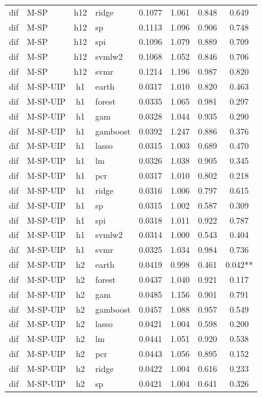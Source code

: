 \begin{ThreePartTable}
\begin{longtable}[t]{llclcccc}
dif & M-SP & h12 & ridge & 0.1077 & 1.061 & 0.848 & 0.649\\
dif & M-SP & h12 & sp & 0.1113 & 1.096 & 0.906 & 0.748\\
dif & M-SP & h12 & spi & 0.1096 & 1.079 & 0.889 & 0.709\\
dif & M-SP & h12 & svmlw2 & 0.1068 & 1.052 & 0.846 & 0.706\\
dif & M-SP & h12 & svmr & 0.1214 & 1.196 & 0.987 & 0.820\\
\addlinespace
dif & M-SP-UIP & h1 & earth & 0.0317 & 1.010 & 0.820 & 0.463\\
dif & M-SP-UIP & h1 & forest & 0.0335 & 1.065 & 0.981 & 0.297\\
dif & M-SP-UIP & h1 & gam & 0.0328 & 1.044 & 0.935 & 0.290\\
dif & M-SP-UIP & h1 & gamboost & 0.0392 & 1.247 & 0.886 & 0.376\\
dif & M-SP-UIP & h1 & lasso & 0.0315 & 1.003 & 0.689 & 0.470\\
dif & M-SP-UIP & h1 & lm & 0.0326 & 1.038 & 0.905 & 0.345\\
dif & M-SP-UIP & h1 & pcr & 0.0317 & 1.010 & 0.802 & 0.218\\
dif & M-SP-UIP & h1 & ridge & 0.0316 & 1.006 & 0.797 & 0.615\\
dif & M-SP-UIP & h1 & sp & 0.0315 & 1.002 & 0.587 & 0.309\\
dif & M-SP-UIP & h1 & spi & 0.0318 & 1.011 & 0.922 & 0.787\\
dif & M-SP-UIP & h1 & svmlw2 & 0.0314 & 1.000 & 0.543 & 0.404\\
dif & M-SP-UIP & h1 & svmr & 0.0325 & 1.034 & 0.984 & 0.736\\
\addlinespace
dif & M-SP-UIP & h2 & earth & 0.0419 & 0.998 & 0.461 & 0.042**\\
dif & M-SP-UIP & h2 & forest & 0.0437 & 1.040 & 0.921 & 0.117\\
dif & M-SP-UIP & h2 & gam & 0.0485 & 1.156 & 0.901 & 0.791\\
dif & M-SP-UIP & h2 & gamboost & 0.0457 & 1.088 & 0.957 & 0.549\\
dif & M-SP-UIP & h2 & lasso & 0.0421 & 1.004 & 0.598 & 0.200\\
dif & M-SP-UIP & h2 & lm & 0.0441 & 1.051 & 0.920 & 0.538\\
dif & M-SP-UIP & h2 & pcr & 0.0443 & 1.056 & 0.895 & 0.152\\
dif & M-SP-UIP & h2 & ridge & 0.0422 & 1.004 & 0.616 & 0.233\\
dif & M-SP-UIP & h2 & sp & 0.0421 & 1.004 & 0.641 & 0.326\\

\end{longtable}
\end{ThreePartTable}

